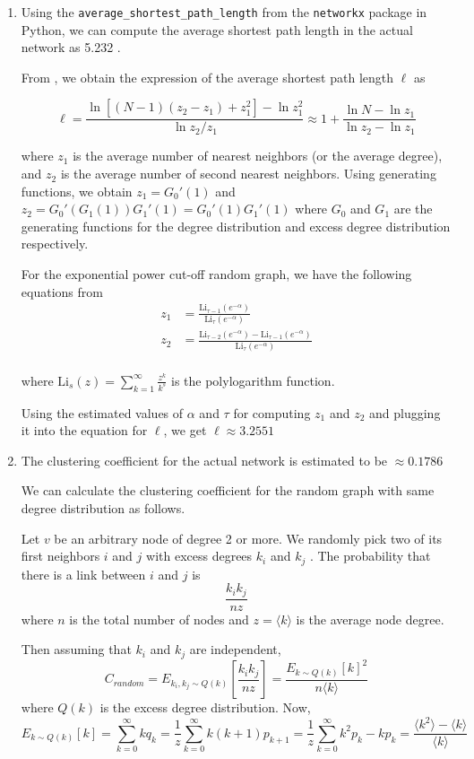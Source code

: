 \documentclass{article}
\newcommand{\Li}{\text{Li}}
\begin{document}
\begin{enumerate}
\item Using the \texttt{average\_shortest\_path\_length} from the \texttt{networkx} package in Python, we can compute the average shortest path length in the actual network as 5.232 .

From \cite{newman}, we obtain the expression of the average shortest path length $\ell$ as 

$$ \ell = \frac{\ln [ (N-1)(z_2 - z_1) + z_1^2 ] -  \ln z_1^2}{\ln z_2/z_1} \approx 1 + \frac{\ln N - \ln z_1}{\ln z_2 - \ln z_1}$$

where $z_1$ is the average number of nearest neighbors (or the average degree), and $z_2$ is the average number of second nearest neighbors. Using generating functions, we obtain $z_1 = G_0'(1)$ and $z_2 = G_0'(G_1(1))G_1'(1) = G_0'(1)G_1'(1) $ where $G_0$ and $G_1$ are the generating functions for the degree distribution and excess degree distribution respectively. 

For the exponential power cut-off random graph, we have the following equations from \cite{newman}
\begin{align}
z_1 &= \frac{\Li_{\tau - 1}(e^{-\alpha})}{\Li_{\tau }(e^{-\alpha})} \\
z_2 &= \frac{\Li_{\tau - 2}(e^{-\alpha})-\Li_{\tau - 1}(e^{-\alpha})}{\Li_{\tau }(e^{-\alpha})}\\
\end{align}

where $\Li_s(z) = \sum_{k=1}^\infty \frac{z^k}{k^s}$ is the polylogarithm function.  

Using the estimated values of $\alpha$ and $\tau$ for computing $z_1$ and $z_2$ and plugging it into the equation for $\ell$, we get $\ell \approx 3.2551$

\item The clustering coefficient for the actual network is estimated to be $\approx 0.1786$

We can calculate the clustering coefficient for the random graph with same degree distribution as follows. 

Let $v$ be an arbitrary node of degree 2 or more. We randomly pick two of its first neighbors $i$ and $j$ with excess degrees $k_i$ and $k_j$ . The probability that there is a link between $i$ and $j$ is $$\frac{k_i k_j}{nz}$$
where $n$ is the total number of nodes and $z = \langle k \rangle$ is the average node degree.

Then assuming that $k_i$ and $k_j$ are independent, $$ C_{random} = E_{k_i, k_j \sim Q(k)}\left[\frac{k_i k_j}{nz}\right] = \frac{ E_{k \sim Q(k)}[k]^2 }{n \langle k \rangle}$$ where $Q(k)$ is the excess degree distribution. Now, $$ E_{k \sim Q(k)}[k] = \sum_{k=0}^\infty kq_k = \frac{1}{z} \sum_{k=0}^\infty k(k+1)p_{k+1} = \frac{1}{z} \sum_{k=0}^\infty k^2 p_{k} - k p_k = \frac{\langle k^2 \rangle - \langle k \rangle}{\langle k \rangle} $$


\end{enumerate}
\end{document}
